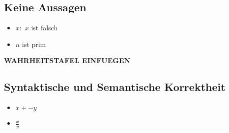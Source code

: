 \subsection{Keine Aussagen}
\begin{itemize}
\item \glqq $x:$ $x$ ist falsch\grqq{}
\item \glqq $n$ ist prim\grqq{}
\end{itemize}
%
\textbf{WAHRHEITSTAFEL EINFUEGEN}
\subsection{Syntaktische und Semantische Korrektheit}
\begin{itemize}
\item \( x + - y \)
\item \( \frac{x}{y} \)
\end{itemize}
%
